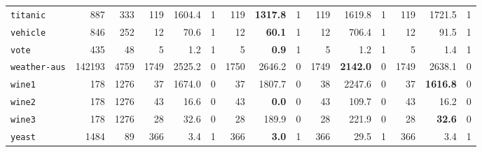 \begin{tabular}{lccrrrrrrrrrrrr}
\texttt{titanic} & \multicolumn{1}{r}{887} & \multicolumn{1}{r}{333}  & 119 & 1604.4 & 1 & 119 & \textbf{1317.8} & 1 & 119 & 1619.8 & 1 & 119 & 1721.5 & 1\\
\texttt{vehicle} & \multicolumn{1}{r}{846} & \multicolumn{1}{r}{252}  & 12 & 70.6 & 1 & 12 & \textbf{60.1} & 1 & 12 & 706.4 & 1 & 12 & 91.5 & 1\\
\texttt{vote} & \multicolumn{1}{r}{435} & \multicolumn{1}{r}{48}  & 5 & 1.2 & 1 & 5 & \textbf{0.9} & 1 & 5 & 1.2 & 1 & 5 & 1.4 & 1\\
\texttt{weather-aus} & \multicolumn{1}{r}{142193} & \multicolumn{1}{r}{4759}  & 1749 & 2525.2 & 0 & 1750 & 2646.2 & 0 & 1749 & \textbf{2142.0} & 0 & 1749 & 2638.1 & 0\\
\texttt{wine1} & \multicolumn{1}{r}{178} & \multicolumn{1}{r}{1276}  & 37 & 1674.0 & 0 & 37 & 1807.7 & 0 & 38 & 2247.6 & 0 & 37 & \textbf{1616.8} & 0\\
\texttt{wine2} & \multicolumn{1}{r}{178} & \multicolumn{1}{r}{1276}  & 43 & 16.6 & 0 & 43 & \textbf{0.0} & 0 & 43 & 109.7 & 0 & 43 & 16.2 & 0\\
\texttt{wine3} & \multicolumn{1}{r}{178} & \multicolumn{1}{r}{1276}  & 28 & 32.6 & 0 & 28 & 189.9 & 0 & 28 & 221.9 & 0 & 28 & \textbf{32.6} & 0\\
\texttt{yeast} & \multicolumn{1}{r}{1484} & \multicolumn{1}{r}{89}  & 366 & 3.4 & 1 & 366 & \textbf{3.0} & 1 & 366 & 29.5 & 1 & 366 & 3.4 & 1\\
\bottomrule
\end{tabular}
